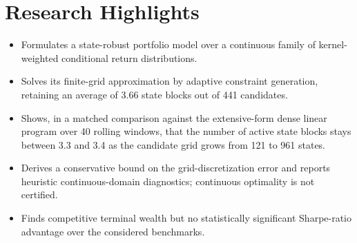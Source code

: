 \documentclass[12pt]{article}
\begin{document}
\section*{Research Highlights}

\begin{itemize}[leftmargin=*]
    \item Formulates a state-robust portfolio model over a continuous family of kernel-weighted conditional return distributions.
    \item Solves its finite-grid approximation by adaptive constraint generation, retaining an average of 3.66 state blocks out of 441 candidates.
    \item Shows, in a matched comparison against the extensive-form dense linear program over 40 rolling windows, that the number of active state blocks stays between 3.3 and 3.4 as the candidate grid grows from 121 to 961 states.
    \item Derives a conservative bound on the grid-discretization error and reports heuristic continuous-domain diagnostics; continuous optimality is not certified.
    \item Finds competitive terminal wealth but no statistically significant Sharpe-ratio advantage over the considered benchmarks.
\end{itemize}
\end{document}
